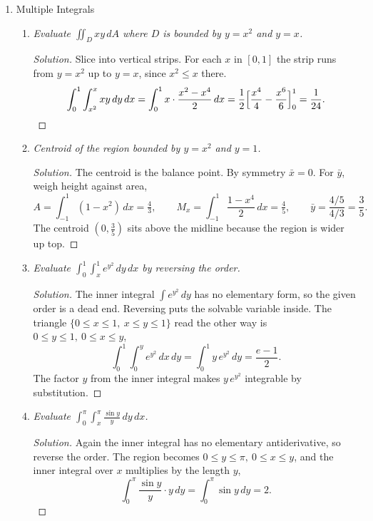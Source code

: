 \documentclass[12pt]{article}
\newenvironment{solution}
  {\renewcommand\qedsymbol{$\blacksquare$}\begin{proof}[Solution]}
  {\end{proof}}
\newcounter{topic}
\begin{document}
\begin{enumerate}\setcounter{enumi}{\value{topic}}

\item Multiple Integrals

    \begin{enumerate}
    \item \textit{Evaluate $\displaystyle\iint_D xy\,dA$ where $D$ is bounded by $y=x^2$ and $y=x$.}

    \begin{solution}
    Slice into vertical strips. For each $x$ in $[0,1]$ the strip runs from $y=x^2$ up to $y=x$, since $x^2\le x$ there.
    \[
      \int_0^1\int_{x^2}^x xy\,dy\,dx=\int_0^1 x\cdot\frac{x^2-x^4}{2}\,dx=\frac12\Bigl[\frac{x^4}{4}-\frac{x^6}{6}\Bigr]_0^1=\frac{1}{24}.
    \]
    \end{solution}

    \item \textit{Centroid of the region bounded by $y=x^2$ and $y=1$.}

    \begin{solution}
    The centroid is the balance point. By symmetry $\bar x=0$. For $\bar y$, weigh height against area,
    \[
      A=\int_{-1}^1(1-x^2)\,dx=\tfrac43,\qquad M_x=\int_{-1}^1\frac{1-x^4}{2}\,dx=\tfrac45,\qquad \bar y=\frac{4/5}{4/3}=\frac35.
    \]
    The centroid $(0,\tfrac35)$ sits above the midline because the region is wider up top.
    \end{solution}

    \item \textit{Evaluate $\displaystyle\int_0^1\int_x^1 e^{y^2}\,dy\,dx$ by reversing the order.}

    \begin{solution}
    The inner integral $\int e^{y^2}\,dy$ has no elementary form, so the given order is a dead end. Reversing puts the solvable variable inside. The triangle $\{0\le x\le1,\ x\le y\le1\}$ read the other way is $0\le y\le1,\ 0\le x\le y$,
    \[
      \int_0^1\int_0^y e^{y^2}\,dx\,dy=\int_0^1 y\,e^{y^2}\,dy=\frac{e-1}{2}.
    \]
    The factor $y$ from the inner integral makes $y\,e^{y^2}$ integrable by substitution.
    \end{solution}

    \item \textit{Evaluate $\displaystyle\int_0^\pi\int_x^\pi\frac{\sin y}{y}\,dy\,dx$.}

    \begin{solution}
    Again the inner integral has no elementary antiderivative, so reverse the order. The region becomes $0\le y\le\pi,\ 0\le x\le y$, and the inner integral over $x$ multiplies by the length $y$,
    \[
      \int_0^\pi\frac{\sin y}{y}\cdot y\,dy=\int_0^\pi\sin y\,dy=2.
    \]
    \end{solution}


\end{enumerate}
\end{enumerate}
\end{document}
